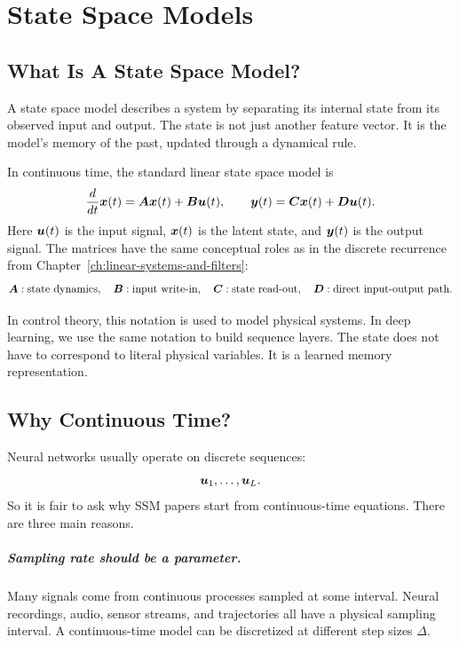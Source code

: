 \chapter{State Space Models}
\label{ch:state-space-models}

\section{What Is A State Space Model?}

A state space model describes a system by separating its internal state from its observed
input and output. The state is not just another feature vector. It is the model's memory
of the past, updated through a dynamical rule.

In continuous time, the standard linear state space model is
\begin{equation}
  \frac{d}{dt}\bm{x}(t) = \bm{A} \bm{x}(t) + \bm{B} \bm{u}(t),
  \qquad
  \bm{y}(t) = \bm{C} \bm{x}(t) + \bm{D} \bm{u}(t).
  \label{eq:continuous-ssm}
\end{equation}
Here $\bm{u}(t)$ is the input signal, $\bm{x}(t)$ is the latent state, and $\bm{y}(t)$ is the
output signal. The matrices have the same conceptual roles as in the discrete recurrence
from Chapter~\ref{ch:linear-systems-and-filters}:
\[
  \bm{A}: \text{state dynamics},\quad
  \bm{B}: \text{input write-in},\quad
  \bm{C}: \text{state read-out},\quad
  \bm{D}: \text{direct input-output path}.
\]

In control theory, this notation is used to model physical systems. In deep learning, we
use the same notation to build sequence layers. The state does not have to correspond to
literal physical variables. It is a learned memory representation.

\section{Why Continuous Time?}

Neural networks usually operate on discrete sequences:
\[
  \bm{u}_1,\ldots,\bm{u}_L.
\]
So it is fair to ask why SSM papers start from continuous-time equations. There are three
main reasons.

\paragraph{Sampling rate should be a parameter.}
Many signals come from continuous processes sampled at some interval. Neural recordings,
audio, sensor streams, and trajectories all have a physical sampling interval. A
continuous-time model can be discretized at different step sizes $\Delta$.

